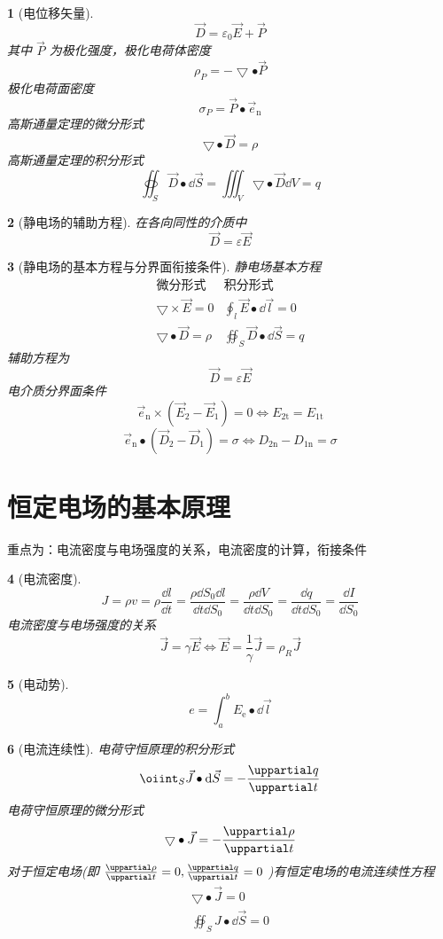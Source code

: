 \documentclass{book}
\theoremstyle{change}
\newtheorem{ti}{}[section]
\def\partial{\uppartial}
\def\ee{\mathrm{e}}
\begin{document}
\begin{ti}[电位移矢量]
\[
	\vec{D}=\varepsilon_0\vec{E}+\vec{P}
\]
其中 $\vec{P}$ 为极化强度，极化电荷体密度
\[
	\rho_P=-\bigtriangledown\bullet\vec{P}
\]
极化电荷面密度
\[
	\sigma_P=\vec{P}\bullet\vec{e}_\mathrm{n}
\]
高斯通量定理的微分形式
\[
	\bigtriangledown\bullet\vec{D}=\rho
\]
高斯通量定理的积分形式
\[
	\oiint_{S}\vec{D}\bullet\dd \vec{S}=\iiint_{V}{\bigtriangledown\bullet\vec{D}}\dd V=q
\]
\end{ti}

\begin{ti}[静电场的辅助方程]
在各向同性的介质中
\[
	\vec{D}=\varepsilon\vec{E}
\]
\end{ti}

\begin{ti}[静电场的基本方程与分界面衔接条件]
静电场基本方程
\[
\begin{matrix}
\text{微分形式}&\text{积分形式}\\
\bigtriangledown\times\vec{E}=0&\oint_l{\vec{E}\bullet\dd \vec{l}}=0\\
\bigtriangledown\bullet\vec{D}=\rho&\oiint_{S}{\vec{D}\bullet\dd \vec{S}}=q
\end{matrix}
\]
辅助方程为
\[
	\vec{D}=\varepsilon\vec{E}
\]
电介质分界面条件
\[
	\vec{e}_{\mathrm{n}}\times(\vec{E}_2-\vec{E}_1)=0\Leftrightarrow E_{2\text{t}}=E_{1\text{t}}
\]
\[
	\vec{e}_\mathrm{n}\bullet(\vec{D}_2-\vec{D}_1)=\sigma\Leftrightarrow D_{2\mathrm{n}}-D_{1\mathrm{n}}=\sigma
\]
\end{ti}

\section{恒定电场的基本原理}
重点为：电流密度与电场强度的关系，电流密度的计算，衔接条件
\begin{ti}[电流密度]
\[
	 J=\rho v=\rho\frac{\dd l}{\dd t}=\frac{\rho\dd S_0\dd l}{\dd t\dd S_0}=\frac{\rho\dd V}{\dd t\dd S_0}=\frac{\dd q}{\dd t\dd S_0}=\frac{\dd I}{\dd S_0}
\]
电流密度与电场强度的关系
\[
	\vec{J}=\gamma\vec{E}\Leftrightarrow\vec{E}=\frac{1}{\gamma}\vec{J}=\rho_R\vec{J}
\]
\end{ti}

\begin{ti}[电动势]
\[
	e=\int_{a}^{b}{E_{\ee }\bullet\dd \vec{l}}
\]
\end{ti}

\begin{ti}[电流连续性]
电荷守恒原理的积分形式
\[
	\oiint_{S}{\vec{J}\bullet\dd \vec{S}}=-\frac{\partial q}{\partial t}
\]
电荷守恒原理的微分形式
\[
	\bigtriangledown\bullet\vec{J}=-\frac{\partial\rho}{\partial t}
\]
对于恒定电场(即 $\frac{\partial\rho}{\partial t}=0,\frac{\partial q}{\partial t}=0$ )有恒定电场的电流连续性方程
\begin{gather*}
	\bigtriangledown\bullet\vec{J}=0\\
	\oiint_{S}{J\bullet\dd \vec{S}}=0
\end{gather*}
\end{ti}
\end{document}
